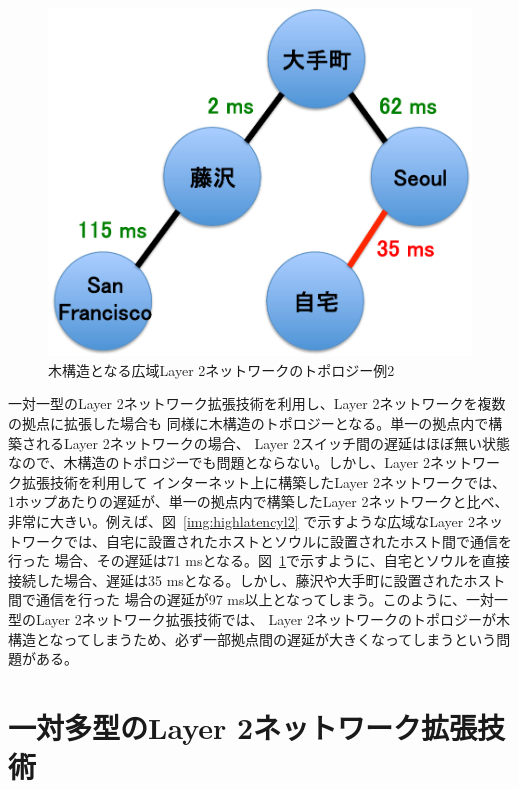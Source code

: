 \begin{figure}
	\begin{center}
		\includegraphics[scale=0.50]{./img/homeandseoul}
		\caption{木構造となる広域Layer 2ネットワークのトポロジー例2}
		\label{img:homeandseoul}
	\end{center}
\end{figure}

一対一型のLayer 2ネットワーク拡張技術を利用し、Layer 2ネットワークを複数の拠点に拡張した場合も
同様に木構造のトポロジーとなる。単一の拠点内で構築されるLayer 2ネットワークの場合、
Layer 2スイッチ間の遅延はほぼ無い状態なので、木構造のトポロジーでも問題とならない。しかし、Layer 2ネットワーク拡張技術を利用して
インターネット上に構築したLayer 2ネットワークでは、1ホップあたりの遅延が、単一の拠点内で構築したLayer 2ネットワークと比べ、非常に大きい。例えば、図~\ref{img:highlatencyl2}
で示すような広域なLayer 2ネットワークでは、自宅に設置されたホストとソウルに設置されたホスト間で通信を行った
場合、その遅延は71 msとなる。図~\ref{img:homeandseoul}で示すように、自宅とソウルを直接
接続した場合、遅延は35 msとなる。しかし、藤沢や大手町に設置されたホスト間で通信を行った
場合の遅延が97 ms以上となってしまう。このように、一対一型のLayer 2ネットワーク拡張技術では、
Layer 2ネットワークのトポロジーが木構造となってしまうため、必ず一部拠点間の遅延が大きくなってしまうという問題がある。


\section{一対多型のLayer 2ネットワーク拡張技術}
\label{rw:pointtomulti}

